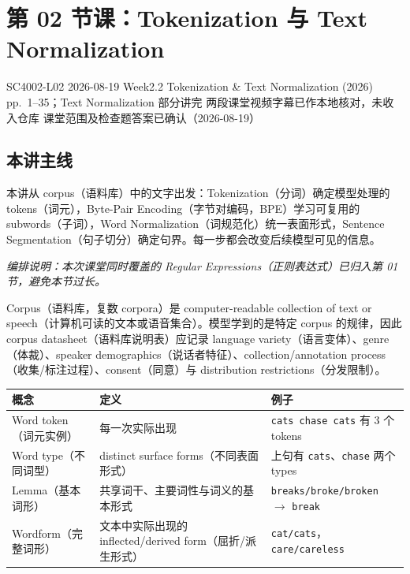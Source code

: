 
\section{第 02 节课：Tokenization 与 Text Normalization}
\label{lecture:SC4002-L02}

\lecturemeta
  {SC4002-L02}
  {2026-08-19}
  {Week2.2 Tokenization \& Text Normalization (2026)}
  {pp.~1--35；Text Normalization 部分讲完}
  {两段课堂视频字幕已作本地核对，未收入仓库}
  {课堂范围及检查题答案已确认（2026-08-19）}

\subsection{本讲主线}

本讲从 corpus（语料库）中的文字出发：Tokenization（分词）确定模型处理的 tokens（词元），Byte-Pair Encoding（字节对编码，BPE）学习可复用的 subwords（子词），Word Normalization（词规范化）统一表面形式，Sentence Segmentation（句子切分）确定句界。每一步都会改变后续模型可见的信息。

\textit{编排说明：本次课堂同时覆盖的 Regular Expressions（正则表达式）已归入第 01 节，避免本节过长。}


Corpus（语料库，复数 corpora）是 computer-readable collection of text or speech（计算机可读的文本或语音集合）。模型学到的是特定 corpus 的规律，因此 corpus datasheet（语料库说明表）应记录 language variety（语言变体）、genre（体裁）、speaker demographics（说话者特征）、collection/annotation process（收集/标注过程）、consent（同意）与 distribution restrictions（分发限制）。

\begin{center}
\small
\begin{tabularx}{\textwidth}{@{}>{\raggedright\arraybackslash}p{3.2cm}X>{\raggedright\arraybackslash}p{4.1cm}@{}}
  \toprule
  概念 & 定义 & 例子 \\
  \midrule
  Word token（词元实例） & 每一次实际出现 & \texttt{cats chase cats} 有 3 个 tokens \\
  Word type（不同词型） & distinct surface forms（不同表面形式） & 上句有 \texttt{cats}、\texttt{chase} 两个 types \\
  Lemma（基本词形） & 共享词干、主要词性与词义的基本形式 & \texttt{breaks/broke/broken} $\rightarrow$ \texttt{break} \\
  Wordform（完整词形） & 文本中实际出现的 inflected/derived form（屈折/派生形式） & \texttt{cat/cats}，\texttt{care/careless} \\
  \bottomrule
\end{tabularx}
\end{center}

